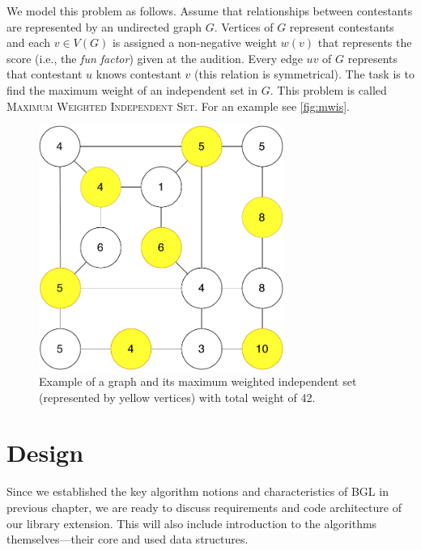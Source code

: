 \documentclass[thesis=B,english]{FITthesis}[2019/03/21]
\begin{document}
We model this problem as follows. Assume that relationships between contestants are represented by an undirected graph $G$. Vertices of $G$ represent contestants and each $v \in V(G)$ is assigned a non-negative weight $w(v)$ that represents the score (i.e., the \emph{fun factor}) given at the audition. Every edge $uv$ of $G$ represents that contestant $u$ knows contestant $v$ (this relation is symmetrical). The task is to find the maximum weight of an independent set in $G$. This problem is called \textsc{Maximum Weighted Independent Set}. For an example see \autoref{fig:mwis}.

\begin{figure}[H]
	\centering
 	\includegraphics[width=8cm]{img/mwis.pdf}
 	\caption[Example of a graph and its maximum weighted independent set]{Example of a graph and its maximum weighted independent set (represented by yellow vertices) with total weight of 42.}
 	\label{fig:mwis}
\end{figure}

\chapter{Design}\label{chap:design}
Since we established the key algorithm notions and characteristics of BGL in previous chapter, we are ready to discuss requirements and code architecture of our library extension. This will also include introduction to the algorithms themselves---their core and used data structures.
\end{document}
